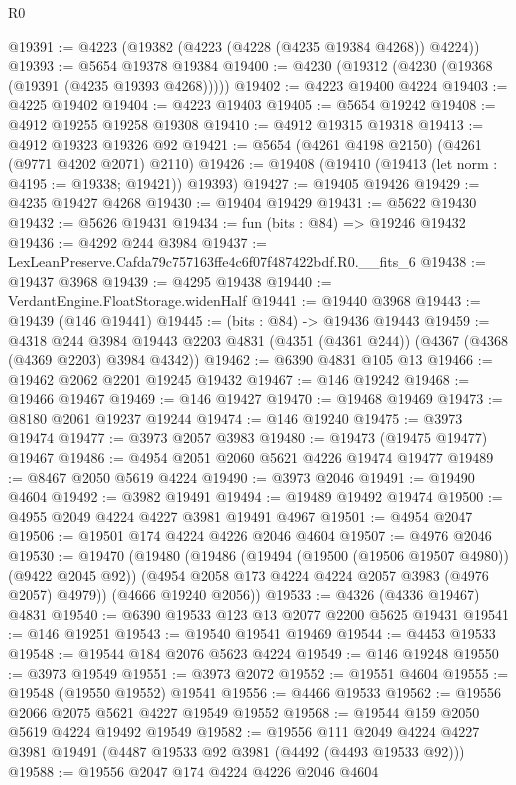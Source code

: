 \begin{lexlean}{R0}
\begin{coremodule}
@19391 := @4223 (@19382 (@4223 (@4228 (@4235 @19384 @4268)) @4224))
@19393 := @5654 @19378 @19384
@19400 := @4230 (@19312 (@4230 (@19368 (@19391 (@4235 @19393 @4268)))))
@19402 := @4223 @19400 @4224
@19403 := @4225 @19402
@19404 := @4223 @19403
@19405 := @5654 @19242
@19408 := @4912 @19255 @19258 @19308
@19410 := @4912 @19315 @19318
@19413 := @4912 @19323 @19326 @92
@19421 := @5654 (@4261 @4198 @2150) (@4261 (@9771 @4202 @2071) @2110)
@19426 := @19408 (@19410 (@19413 (let norm : @4195 := @19338; @19421)) @19393)
@19427 := @19405 @19426
@19429 := @4235 @19427 @4268
@19430 := @19404 @19429
@19431 := @5622 @19430
@19432 := @5626 @19431
@19434 := fun (bits : @84) => @19246 @19432
@19436 := @4292 @244 @3984
@19437 := LexLeanPreserve.Cafda79c757163ffe4c6f07f487422bdf.R0.__fits_6
@19438 := @19437 @3968
@19439 := @4295 @19438
@19440 := VerdantEngine.FloatStorage.widenHalf
@19441 := @19440 @3968
@19443 := @19439 (@146 @19441)
@19445 := (bits : @84) -> @19436 @19443
@19459 := @4318
    @244
    @3984
    @19443
    @2203
    @4831
    (@4351 (@4361 @244))
    (@4367 (@4368 (@4369 @2203) @3984 @4342))
@19462 := @6390 @4831 @105 @13
@19466 := @19462 @2062 @2201 @19245 @19432
@19467 := @146 @19242
@19468 := @19466 @19467
@19469 := @146 @19427
@19470 := @19468 @19469
@19473 := @8180 @2061 @19237 @19244
@19474 := @146 @19240
@19475 := @3973 @19474
@19477 := @3973 @2057 @3983
@19480 := @19473 (@19475 @19477) @19467
@19486 := @4954 @2051 @2060 @5621 @4226 @19474 @19477
@19489 := @8467 @2050 @5619 @4224
@19490 := @3973 @2046
@19491 := @19490 @4604
@19492 := @3982 @19491
@19494 := @19489 @19492 @19474
@19500 := @4955 @2049 @4224 @4227 @3981 @19491 @4967
@19501 := @4954 @2047
@19506 := @19501 @174 @4224 @4226 @2046 @4604
@19507 := @4976 @2046
@19530 := @19470
    (@19480
      (@19486
        (@19494 (@19500 (@19506 @19507 @4980)) (@9422 @2045 @92))
        (@4954 @2058 @173 @4224 @4224 @2057 @3983 (@4976 @2057) @4979))
      (@4666 @19240 @2056))
@19533 := @4326 (@4336 @19467) @4831
@19540 := @6390 @19533 @123 @13 @2077 @2200 @5625 @19431
@19541 := @146 @19251
@19543 := @19540 @19541 @19469
@19544 := @4453 @19533
@19548 := @19544 @184 @2076 @5623 @4224
@19549 := @146 @19248
@19550 := @3973 @19549
@19551 := @3973 @2072
@19552 := @19551 @4604
@19555 := @19548 (@19550 @19552) @19541
@19556 := @4466 @19533
@19562 := @19556 @2066 @2075 @5621 @4227 @19549 @19552
@19568 := @19544 @159 @2050 @5619 @4224 @19492 @19549
@19582 := @19556
    @111
    @2049
    @4224
    @4227
    @3981
    @19491
    (@4487 @19533 @92 @3981 (@4492 (@4493 @19533 @92)))
@19588 := @19556 @2047 @174 @4224 @4226 @2046 @4604

\end{coremodule}
\end{lexlean}
